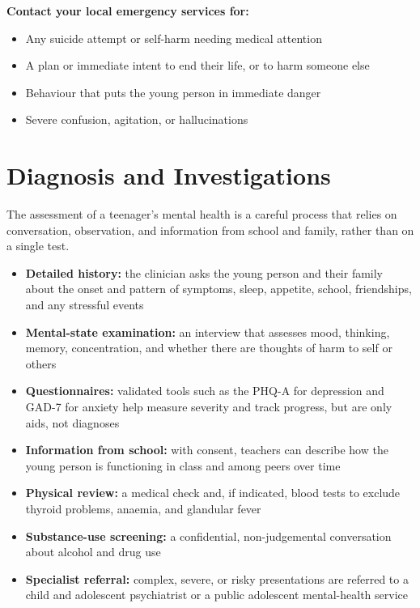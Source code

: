 \textbf{Contact your local emergency services for:}
\begin{itemize}
    \item Any suicide attempt or self-harm needing medical attention
    \item A plan or immediate intent to end their life, or to harm someone else
    \item Behaviour that puts the young person in immediate danger
    \item Severe confusion, agitation, or hallucinations
\end{itemize}

\section*{Diagnosis and Investigations}
The assessment of a teenager's mental health is a careful process that relies on conversation, observation, and information from school and family, rather than on a single test.

\begin{itemize}
    \item \textbf{Detailed history:} the clinician asks the young person and their family about the onset and pattern of symptoms, sleep, appetite, school, friendships, and any stressful events
    \item \textbf{Mental-state examination:} an interview that assesses mood, thinking, memory, concentration, and whether there are thoughts of harm to self or others
    \item \textbf{Questionnaires:} validated tools such as the PHQ-A for depression and GAD-7 for anxiety help measure severity and track progress, but are only aids, not diagnoses
    \item \textbf{Information from school:} with consent, teachers can describe how the young person is functioning in class and among peers over time
    \item \textbf{Physical review:} a medical check and, if indicated, blood tests to exclude thyroid problems, anaemia, and glandular fever
    \item \textbf{Substance-use screening:} a confidential, non-judgemental conversation about alcohol and drug use
    \item \textbf{Specialist referral:} complex, severe, or risky presentations are referred to a child and adolescent psychiatrist or a public adolescent mental-health service
\end{itemize}

